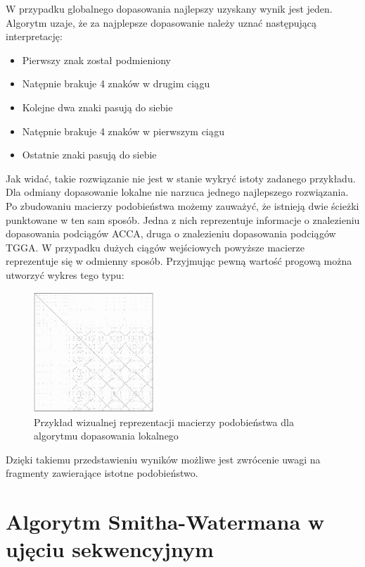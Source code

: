 \documentclass[a4paper,12pt]{article}
\newenvironment{lista}{
\begin{itemize}
  \setlength{\itemsep}{1pt}
  \setlength{\parskip}{0pt}
  \setlength{\parsep}{0pt}
}{\end{itemize}}
\begin{document}
W przypadku globalnego dopasowania najlepszy uzyskany wynik jest jeden. Algorytm uzaje, że za najplepsze dopasowanie należy uznać następującą interpretację: 
\begin{lista}
 \item Pierwszy znak został podmieniony
\item Natępnie brakuje 4 znaków w drugim ciągu
\item Kolejne dwa znaki pasują do siebie
\item Natępnie brakuje 4 znaków w pierwszym ciągu
\item Ostatnie znaki pasują do siebie
\end{lista}

Jak widać, takie rozwiązanie nie jest w stanie wykryć istoty zadanego przykładu. Dla odmiany dopasowanie lokalne nie narzuca jednego najlepszego rozwiązania. Po zbudowaniu macierzy podobieństwa możemy zauważyć, że istnieją dwie ścieżki punktowane w ten sam sposób. Jedna z nich reprezentuje informacje o znalezieniu dopasowania podciągów ACCA, druga o znalezieniu dopasowania podciągów TGGA. W przypadku dużych ciągów wejściowych powyższe macierze reprezentuje się w odmienny sposób. Przyjmując pewną wartość progową można utworzyć wykres tego typu:

\begin{figure}[H]
  \vspace{5pt}
  \centering
  \begin{center}
  \includegraphics[width=0.4\textwidth]{images/macierz.png}
  \end{center}
  \caption{Przykład wizualnej reprezentacji macierzy podobieństwa dla algorytmu dopasowania lokalnego}
\end{figure}

Dzięki takiemu przedstawieniu wyników możliwe jest zwrócenie uwagi na fragmenty zawierające istotne podobieństwo. 


\section*{Algorytm Smitha-Watermana w ujęciu sekwencyjnym}
\end{document}

